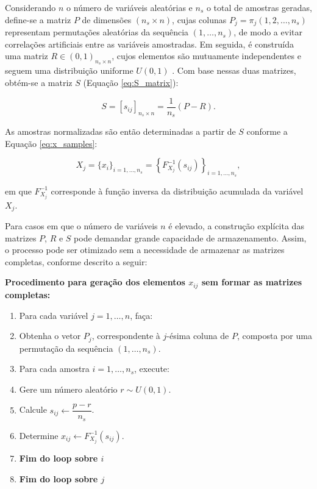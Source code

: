 Considerando $n$ o número de variáveis aleatórias e $n_s$ o total de amostras geradas, define-se a matriz $P$ de dimensões $(n_s \times n)$, cujas colunas
$P_j = \pi_j(1, 2, \ldots, n_s)$ representam permutações aleatórias da sequência $(1, \ldots, n_s)$, de modo a evitar correlações artificiais entre as variáveis amostradas.
Em seguida, é construída uma matriz $R \in (0,1)_{n_s \times n}$, cujos elementos são mutuamente independentes e seguem uma distribuição uniforme $U(0,1)$ \cite{olsson_latin_2003}.  
Com base nessas duas matrizes, obtém-se a matriz $S$ (Equação \eqref{eq:S_matrix}):

\begin{equation}
S = [s_{ij}]_{n_s \times n} 
= \frac{1}{n_s} (P - R).
\label{eq:S_matrix}
\end{equation}

As amostras normalizadas são então determinadas a partir de $S$ conforme a Equação \eqref{eq:x_samples}:

\begin{equation}
X_j = \{ x_i \}_{i=1,\ldots,n_s} 
= \left\{ F^{-1}_{X_j}(s_{ij}) \right\}_{i=1,\ldots,n_s},
\label{eq:x_samples}
\end{equation}

em que $F^{-1}_{X_j}$ corresponde à função inversa da distribuição acumulada da variável $X_j$.

Para casos em que o número de variáveis $n$ é elevado, a construção explícita das matrizes $P$, $R$ e $S$ pode demandar grande capacidade de armazenamento. Assim, o processo pode ser otimizado sem a necessidade de armazenar as matrizes completas, conforme descrito a seguir:

\vspace{1em}

\textbf{Procedimento para geração dos elementos $x_{ij}$ sem formar as matrizes completas:}  
\begin{enumerate}
    \item Para cada variável $j = 1, \dots, n$, faça:
    \item[] \quad Obtenha o vetor $P_j$, correspondente à $j$-ésima coluna de $P$, composta por uma permutação da sequência $(1, \dots, n_s)$.
    \item Para cada amostra $i = 1, \dots, n_s$, execute:
    \item[] \quad Gere um número aleatório $r \sim U(0,1)$.
    \item[] \quad Calcule $s_{ij} \gets \dfrac{p - r}{n_s}$.
    \item[] \quad Determine $x_{ij} \gets F_{X_j}^{-1}(s_{ij})$.
    \item[] \textbf{Fim do loop sobre $i$}
    \item[] \textbf{Fim do loop sobre $j$}
\end{enumerate}


